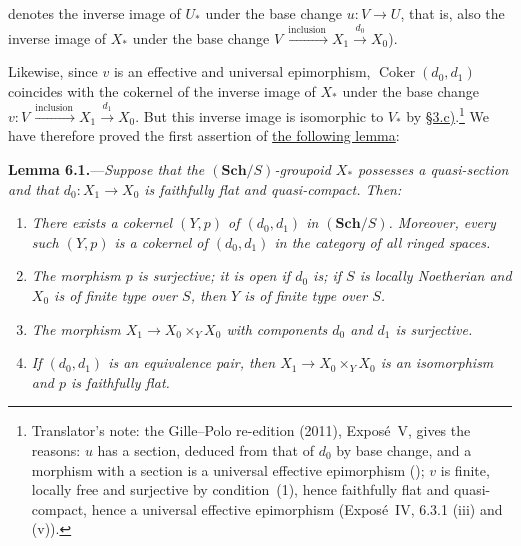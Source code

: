 
denotes the inverse image of \(U_\ast\) under the base change \(u:V\to U\),
that is, also the inverse image of \(X_\ast\) under the base change
\(V\xrightarrow{\ \mathrm{inclusion}\ }X_1\xrightarrow{\ d_0\ }X_0\)).

Likewise, since \(v\) is an effective and universal epimorphism,
\(\operatorname{Coker}(d_0,d_1)\) coincides with the cokernel of the inverse
image of \(X_\ast\) under the base change
\(v:V\xrightarrow{\ \mathrm{inclusion}\ }X_1\xrightarrow{\ d_1\ }X_0\). But this
inverse image is isomorphic to \(V_\ast\) by \hyperref[par:sga3-V-3-c]{\S3.c)}.\footnote{Translator's note: the Gille--Polo re-edition (2011), Exposé~V, gives
the reasons: \(u\) has a section, deduced from that of \(d_0\) by base
change, and a morphism with a section is a universal effective epimorphism
(); \(v\) is finite, locally free and surjective by
condition~(1), hence faithfully flat and quasi-compact, hence a universal
effective epimorphism (Exposé~IV, 6.3.1 (iii) and (v)).} We have therefore
proved the first assertion of \hyperref[lem:sga3-V-6.1]{the following lemma}:

\medskip
{}\label{lem:sga3-V-6.1}%
\noindent\textbf{Lemma 6.1.}---\emph{Suppose that the
\((\mathbf{Sch}/S)\)-groupoid \(X_\ast\) possesses a quasi-section and that
\(d_0:X_1\to X_0\) is faithfully flat and quasi-compact. Then:}
\begin{enumerate}
\item[\SGAInlineRefTarget{lem:sga3-V-6.1:item:i}(i)]\label{lem:sga3-V-6.1-i}%
\emph{There exists a cokernel \((Y,p)\) of
  \((d_0,d_1)\) in \((\mathbf{Sch}/S)\). Moreover, every such
  \((Y,p)\) is a cokernel of \((d_0,d_1)\) in the category of all
  ringed spaces.}
\item[(ii)]\label{lem:sga3-V-6.1-ii}%
\emph{The morphism \(p\) is surjective; it is open if \(d_0\) is; if \(S\)
  is locally Noetherian and \(X_0\) is of finite type over \(S\), then \(Y\) is
  of finite type over \(S\).}
\item[(iii)]\label{lem:sga3-V-6.1-iii}%
\emph{The morphism
  \(X_1\to X_0\times_Y X_0\) with components \(d_0\) and \(d_1\) is
  surjective.}
\item[(iv)]\label{lem:sga3-V-6.1-iv}%
\emph{If \((d_0,d_1)\) is an equivalence pair, then
  \(X_1\to X_0\times_Y X_0\) is an isomorphism and \(p\) is faithfully
  flat.}
\end{enumerate}

